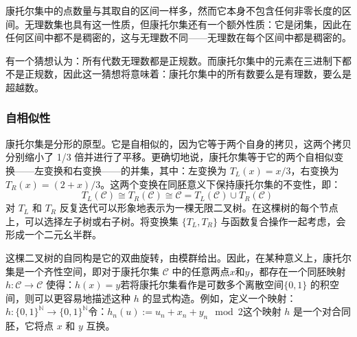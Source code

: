 康托尔集中的点数量与其取自的区间一样多，然而它本身不包含任何非零长度的区间。无理数集也具有这一性质，但康托尔集还有一个额外性质：它是闭集，因此在任何区间中都不是稠密的，这与无理数不同——无理数在每个区间中都是稠密的。

有一个猜想认为：所有代数无理数都是正规数。而康托尔集中的元素在三进制下都不是正规数，因此这一猜想将意味着：康托尔集中的所有数要么是有理数，要么是超越数。
\subsubsection{自相似性}
康托尔集是分形的原型。它是自相似的，因为它等于两个自身的拷贝，这两个拷贝分别缩小了 1/3 倍并进行了平移。更确切地说，康托尔集等于它的两个自相似变换——左变换和右变换——的并集，其中：左变换为 $T_L(x) = x/3$，右变换为 $T_R(x) = (2 + x)/3$。这两个变换在同胚意义下保持康托尔集的不变性，即：
$$
T_L(\mathcal{C}) \cong T_R(\mathcal{C}) \cong \mathcal{C} = T_L(\mathcal{C}) \cup T_R(\mathcal{C})~
$$
对 $T_L$ 和 $T_R$ 反复迭代可以形象地表示为一棵无限二叉树。在这棵树的每个节点上，可以选择左子树或右子树。将变换集 $\{T_L, T_R\}$ 与函数复合操作一起考虑，会形成一个二元幺半群。

这棵二叉树的自同构是它的双曲旋转，由模群给出。因此，在某种意义上，康托尔集是一个齐性空间，即对于康托尔集 $\mathcal{C}$ 中的任意两点$x$和$y$，都存在一个同胚映射$h: \mathcal{C} \to \mathcal{C}$ 使得：$h(x) = y$若将康托尔集看作是可数多个离散空间$\{0,1\}$ 的积空间，则可以更容易地描述这种 $h$ 的显式构造。例如，定义一个映射：$h: \{0,1\}^{\mathbb{N}} \to \{0,1\}^{\mathbb{N}}$令：$h_n(u) := u_n + x_n + y_n \mod 2$这个映射 $h$ 是一个对合同胚，它将点 $x$ 和 $y$ 互换。
